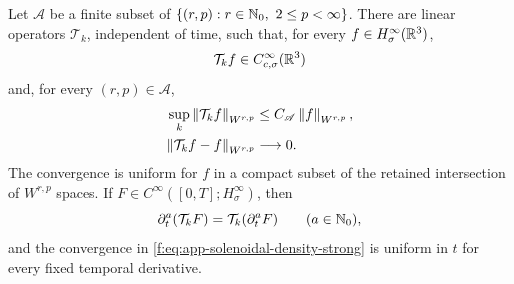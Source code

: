 \begin{lemma}
\label{f:lem:app-solenoidal-density}
Let \(\mathscr A\) be a finite subset of
\(\{(r,p):r\in\Nzero,\ 2\le p<\infty\}\).  There are linear operators
\(\mathcal T_k\), independent of time, such that, for every
\(f\in H^\infty_\sigma(\mathbb R^3)\),
\[
 \mathcal T_kf\in C_{c,\sigma}^\infty(\mathbb R^3)
\]
and, for every \((r,p)\in\mathscr A\),
\begin{align}
 \sup_k\left\lVert \mathcal T_kf\right\rVert_{W^{r,p}}
 &\le C_{\mathscr A}\left\lVert f\right\rVert_{W^{r,p}},
 \label{f:eq:app-solenoidal-density-uniform}\\
 \left\lVert \mathcal T_kf-f\right\rVert_{W^{r,p}}&\longrightarrow0.
 \label{f:eq:app-solenoidal-density-strong}
\end{align}
The convergence is uniform for \(f\) in a compact subset of the retained
intersection of \(W^{r,p}\) spaces.  If
\(F\in C^\infty([0,T];H^\infty_\sigma)\), then
\begin{equation}
 \partial_t^a(\mathcal T_kF)=\mathcal T_k(\partial_t^aF)
 \qquad(a\in\mathbb N_0),
 \label{f:eq:app-solenoidal-density-time}
\end{equation}
and the convergence in
\eqref{f:eq:app-solenoidal-density-strong} is uniform in \(t\) for every
fixed temporal derivative.
\end{lemma}

